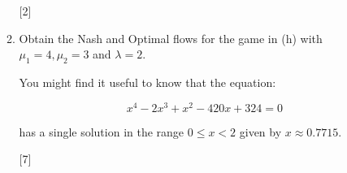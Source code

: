 \documentclass[12pt,a4paper]{article}
\makeatletter
\renewcommand{\@oddfoot}{\hfil \arabic{page} \hfil}    %
\makeatother
\begin{document}
\begin{enumerate}
\begin{enumerate}
        \hfill{[2]}

        \item Obtain the Nash and Optimal flows for the game in (h) with \(\mu_1=4,\mu_2=3\) and \(\lambda=2\).

        You might find it useful to know that the equation:

        \[x^4-2x^3+x^2-420x+324=0\]

        has a single solution in the range $0\leq x<2$ given by $x\approx 0.7715$.

        \hfill{[7]}

    \end{enumerate}
\end{enumerate}


\makeatletter
\renewcommand{\@oddfoot}{\hfil \arabic{page}X \hfil}    %
\makeatother
\end{document}
